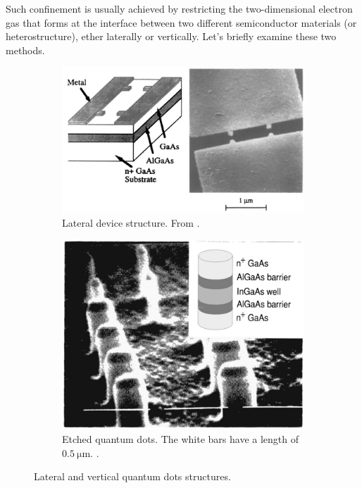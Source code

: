 \documentclass[a4paper,twoside,11pt]{book}
\begin{document}
Such confinement is usually achieved by restricting the two-dimensional electron gas that forms at the interface between two different semiconductor materials (or heterostructure), ether laterally or vertically. Let's briefly examine these two methods.

\begin{figure}[H]
	\centering
	\begin{subfigure}[b]{0.5\textwidth}
		\includegraphics[width=\textwidth]{Figure_5_Reimann}
		\caption{Lateral device structure. From \cite{Reimann2002}.}
		\label{fig:Figure_5_Reimann}
    \end{subfigure}
	\begin{subfigure}[b]{0.4\textwidth}
		\includegraphics[width=\textwidth]{Figure_4_Reimann}
		\caption{Etched quantum dots. The white bars have a length of $\SI{0.5}{\micro\meter}$. \cite{Reimann2002}.}
		\label{fig:Figure_4_Reimann}
    \end{subfigure}
    \caption{Lateral and vertical quantum dots structures.}
	\label{fig:Figures_4-5_Reimann}
\end{figure}
\end{document}
